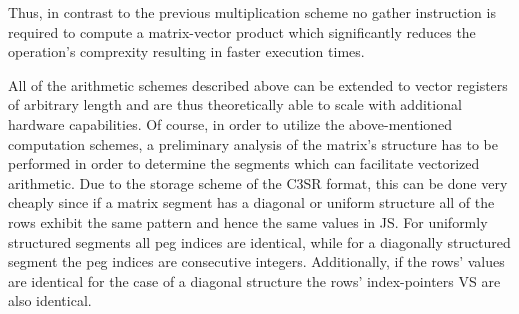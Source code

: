 
       Thus, in contrast to the previous multiplication scheme no gather instruction is required to compute a
       matrix-vector product which significantly reduces the operation's comprexity resulting in faster execution times.


      All of the arithmetic schemes described above can be extended to vector registers of arbitrary length and are thus
      theoretically able to scale with additional hardware capabilities. Of course, in order to utilize the
      above-mentioned computation schemes, a preliminary analysis of the matrix's structure has to be performed in order
      to determine the segments which can facilitate vectorized arithmetic. Due to the storage scheme of the C3SR
      format, this can be done very cheaply since if a matrix segment has a diagonal or uniform structure all of the
      rows exhibit the same pattern and hence the same values in JS. For uniformly structured segments all peg indices
      are identical, while for a diagonally structured segment the peg indices are consecutive integers. Additionally,
      if the rows' values are identical for the case of a diagonal structure the rows' index-pointers VS are also
      identical.

